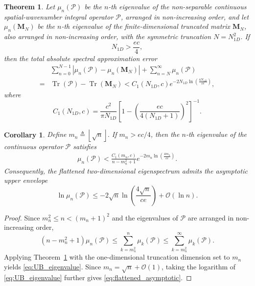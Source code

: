 \documentclass[10pt,a4paper]{amsart}
\newtheorem{theorem}{Theorem}
\newtheorem{corollary}{Corollary}
\begin{document}
\begin{theorem}
	\label{theorem:approx_error}
	Let $\mu_n(\mathcal{P})$ be the $n$-th eigenvalue of the
	non-separable continuous spatial-wavenumber integral operator
	$\mathcal{P}$, arranged in non-increasing order, and let
	$\mu_n(\mathbf{M}_N)$ be the $n$-th eigenvalue of the
	finite-dimensional truncated matrix $\mathbf{M}_N$, also arranged
	in non-increasing order, with the symmetric truncation
	$N=N_{1D}^2$. If
	$$
		N_{1D}>\frac{ec}{4},
	$$
	then the total absolute spectral approximation error
	\begin{align}
		&\sum_{n=0}^{N-1}
		\left|
		\mu_n(\mathcal{P})-\mu_n(\mathbf{M}_N)
		\right|
		+
		\sum_{n=N}^{\infty}\mu_n(\mathcal{P})
		\nonumber\\
		= & 
		\operatorname{Tr}(\mathcal{P})
		-
		\operatorname{Tr}(\mathbf{M}_N) <
		C_1(N_{1D},c)
		e^{-2N_{1D}
			\ln\left(\frac{4N_{1D}}{ce}\right)}, \nonumber
		\label{eq:error_truncation}
	\end{align}
	where
	\begin{equation}
		C_1(N_{1D},c)
		=
		\frac{c^2}{\pi N_{1D}}
		\left[
		1-
		\left(
		\frac{ec}{4(N_{1D}+1)}
		\right)^2
		\right]^{-1}.
		\label{eq:C1_definition}
	\end{equation}
\end{theorem}

\begin{corollary}
	\label{corollary:eigenspectrum_decay}
	Define $m_n \triangleq \left\lfloor\sqrt{n}\right\rfloor.$
	If $m_n>ec/4$, then the $n$-th eigenvalue of the continuous
	operator $\mathcal{P}$ satisfies
	\begin{align}
		\mu_n(\mathcal{P})
		<
		\frac{C_1(m_n,c)}
		{n-m_n^2+1}
		e^{-2m_n
			\ln\left(\frac{4m_n}{ce}\right)}.
		\label{eq:UB_eigenvalue}
	\end{align}
	Consequently, the flattened two-dimensional eigenspectrum
	admits the asymptotic upper envelope
	\begin{equation}
		\ln\mu_n(\mathcal{P})
		\leq
		-2\sqrt{n}
		\ln\left(\frac{4\sqrt{n}}{ce}\right)
		+\mathcal{O}(\ln n).
		\label{eq:flattened_asymptotic}
	\end{equation}
\end{corollary}

\begin{proof}
	Since $m_n^2\leq n<(m_n+1)^2$ and the eigenvalues of
	$\mathcal{P}$ are arranged in non-increasing order,
	$$
		(n-m_n^2+1)\mu_n(\mathcal{P})
		\leq
		\sum_{k=m_n^2}^{n}\mu_k(\mathcal{P})\leq
		\sum_{k=m_n^2}^{\infty}\mu_k(\mathcal{P}).
	$$
	Applying Theorem~\ref{theorem:approx_error} with the
	one-dimensional truncation dimension set to $m_n$ yields
	\eqref{eq:UB_eigenvalue}. Since
	$m_n=\sqrt{n}+\mathcal{O}(1)$, taking the logarithm of
	\eqref{eq:UB_eigenvalue} further gives
	\eqref{eq:flattened_asymptotic}.
\end{proof}
\end{document}
